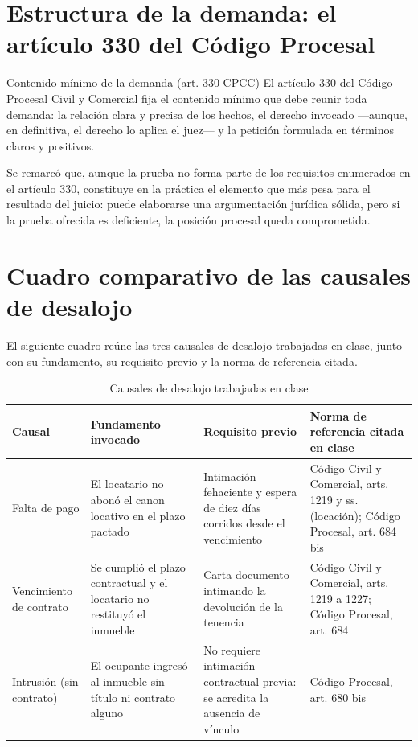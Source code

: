 \documentclass[12pt,oneside]{book}
\begin{document}
\section{Estructura de la demanda: el artículo 330 del Código Procesal}

\begin{definition}{Contenido mínimo de la demanda (art. 330 CPCC)}
El artículo 330 del Código Procesal Civil y Comercial fija el contenido mínimo que debe reunir toda demanda: la relación clara y precisa de los hechos, el derecho invocado ---aunque, en definitiva, el derecho lo aplica el juez--- y la petición formulada en términos claros y positivos.
\end{definition}

Se remarcó que, aunque la prueba no forma parte de los requisitos enumerados en el artículo 330, constituye en la práctica el elemento que más pesa para el resultado del juicio: puede elaborarse una argumentación jurídica sólida, pero si la prueba ofrecida es deficiente, la posición procesal queda comprometida.

\section{Cuadro comparativo de las causales de desalojo}

El siguiente cuadro reúne las tres causales de desalojo trabajadas en clase, junto con su fundamento, su requisito previo y la norma de referencia citada.

\begin{table}[H]
\centering
\small
\begin{tabularx}{\textwidth}{
    >{\raggedright\arraybackslash}p{2.6cm}
    >{\raggedright\arraybackslash}X
    >{\raggedright\arraybackslash}X
    >{\raggedright\arraybackslash}X
}
\toprule
\textbf{Causal} & \textbf{Fundamento invocado} & \textbf{Requisito previo} & \textbf{Norma de referencia citada en clase} \\
\midrule
Falta de pago &
El locatario no abonó el canon locativo en el plazo pactado &
Intimación fehaciente y espera de diez días corridos desde el vencimiento &
Código Civil y Comercial, arts. 1219 y ss. (locación); Código Procesal, art. 684 bis \\
\addlinespace
Vencimiento de contrato &
Se cumplió el plazo contractual y el locatario no restituyó el inmueble &
Carta documento intimando la devolución de la tenencia &
Código Civil y Comercial, arts. 1219 a 1227; Código Procesal, art. 684 \\
\addlinespace
Intrusión (sin contrato) &
El ocupante ingresó al inmueble sin título ni contrato alguno &
No requiere intimación contractual previa: se acredita la ausencia de vínculo &
Código Procesal, art. 680 bis \\
\bottomrule
\end{tabularx}
\caption{Causales de desalojo trabajadas en clase}
\end{table}
\end{document}
